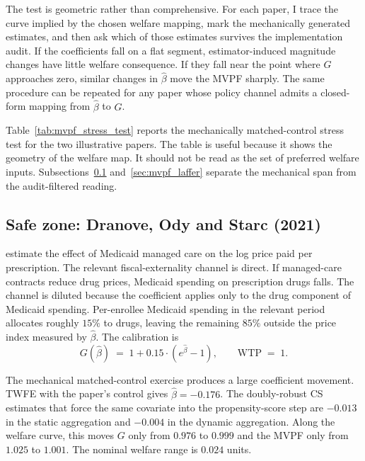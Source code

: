 The test is geometric rather than comprehensive. For each paper, I trace the curve implied by the chosen welfare mapping, mark the mechanically generated estimates, and then ask which of those estimates survives the implementation audit. If the coefficients fall on a flat segment, estimator-induced magnitude changes have little welfare consequence. If they fall near the point where \(G\) approaches zero, similar changes in \(\hat\beta\) move the MVPF sharply. The same procedure can be repeated for any paper whose policy channel admits a closed-form mapping from \(\hat\beta\) to \(G\).

Table~\ref{tab:mvpf_stress_test} reports the mechanically matched-control stress test for the two illustrative papers. The table is useful because it shows the geometry of the welfare map. It should not be read as the set of preferred welfare inputs. Subsections~\ref{sec:mvpf_safe} and~\ref{sec:mvpf_laffer} separate the mechanical span from the audit-filtered reading.




\subsection{Safe zone: Dranove, Ody and Starc (2021)}
\label{sec:mvpf_safe}

\textcite{dranove2021dose} estimate the effect of Medicaid managed care on the log price paid per prescription. The relevant fiscal-externality channel is direct. If managed-care contracts reduce drug prices, Medicaid spending on prescription drugs falls. The channel is diluted because the coefficient applies only to the drug component of Medicaid spending. Per-enrollee Medicaid spending in the relevant period allocates roughly \(15\%\) to drugs, leaving the remaining \(85\%\) outside the price index measured by \(\hat\beta\). The calibration is
\begin{equation*}
G(\hat\beta) \;=\; 1 + 0.15\cdot(e^{\hat\beta}-1), \qquad \mathrm{WTP} \;=\; 1.
\end{equation*}

The mechanical matched-control exercise produces a large coefficient movement. TWFE with the paper's control gives \(\hat\beta=-0.176\). The doubly-robust CS estimates that force the same covariate into the propensity-score step are \(-0.013\) in the static aggregation and \(-0.004\) in the dynamic aggregation. Along the welfare curve, this moves \(G\) only from \(0.976\) to \(0.999\) and the MVPF only from \(1.025\) to \(1.001\). The nominal welfare range is \(0.024\) units.

